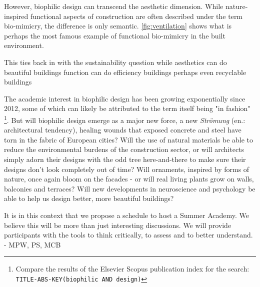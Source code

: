 \documentclass{article}
\begin{document}
\begin{multicols}{2}

However, biophilic design can transcend the aesthetic dimension. While nature-inspired functional aspects of construction are often described under the term bio-mimicry, the difference is only semantic. \cref{fig:ventilation} shows what is perhaps the most famous example of functional bio-mimicry in the built environment. 

This ties back in with the sustainability question
while aesthetics can do beautiful buildings
function can do efficiency buildings
perhaps even recyclable buildings

The academic interest in biophilic design has been growing exponentially since 2012, some of which can likely be attributed to the term itself being "in fashion" \footnote{Compare the results of the Elsevier Scopus publication index for the search: \texttt{TITLE-ABS-KEY(biophilic AND design)}}. But will biophilic design emerge as a major new force, a new \textit{Strömung} (en.: architectural tendency), healing wounds that exposed concrete and steel have torn in the fabric of European cities? Will the use of natural materials be able to reduce the environmental burdens of the construction sector, or will architects simply adorn their designs with the odd tree here-and-there to make sure their designs don't look completely out of time? Will ornaments, inspired by forms of nature, once again bloom on the facades - or will real living plants grow on walls, balconies and terraces? Will new developments in neuroscience and psychology be able to help us design better, more beautiful buildings?

It is in this context that we propose a schedule to host a Summer Academy. We believe this will be more than just interesting discussions. We will provide participants with the tools to think critically, to assess and to better understand. \newline - MPW, PS, MCB


\end{multicols}
\end{document}
